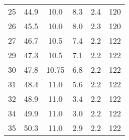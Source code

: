 \begin{table}
\begin{tabular}{S[table-format = 2.0] S[table-format = 2.1] S[table-format = 2.2] S[table-format = 2.1] S[table-format = 1.1] S[table-format = 3.0]}
        25 &	44.9 &	10.0  &	 8.3 &  2.4	 &  120 \\
        26 &	45.5 &	10.0  &	 8.0 &  2.3	 &  120 \\
        27 &	46.7 &	10.5  &	 7.4 &  2.2	 &  122 \\
        29 &	47.3 &	10.5  &	 7.1 &  2.2	 &  122 \\
        30 &	47.8 &	10.75 &	 6.8 &  2.2  &	122 \\
        31 &	48.4 &	11.0  &	 5.6 &  2.2	 &  122 \\
        32 &	48.9 &	11.0  &	 3.4 &  2.2	 &  122 \\
        34 &	49.9 &	11.0  &	 3.0 &  2.2	 &  122 \\
        35 &	50.3 &	11.0  &	 2.9 &  2.2  &	122 \\
        \bottomrule
    \end{tabular}
\end{table}
